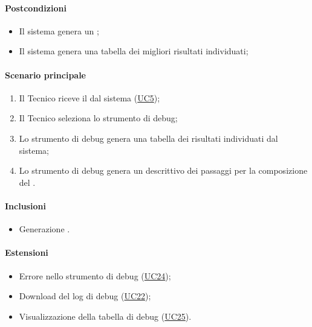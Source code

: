 \paragraph*{Postcondizioni}
\begin{itemize}
  \item Il sistema genera un ;
  \item Il sistema genera una tabella dei migliori risultati individuati;
\end{itemize}

\paragraph*{Scenario principale}
\begin{enumerate}
  \item Il Tecnico riceve il  dal sistema (\hyperref[UC5]{UC5});
  \item Il Tecnico seleziona lo strumento di debug;
  \item Lo strumento di debug genera una tabella dei risultati individuati dal sistema; 
  \item Lo strumento di debug genera un  descrittivo dei passaggi per la composizione del .  
\end{enumerate}

\paragraph*{Inclusioni}
\begin{itemize}
  \item Generazione .
\end{itemize}

\paragraph*{Estensioni}
\begin{itemize}
  \item Errore nello strumento di debug (\hyperref[UC24]{UC24});
  \item Download del log di debug (\hyperref[UC22]{UC22});
  \item Visualizzazione della tabella di debug (\hyperref[UC25]{UC25}).
\end{itemize}
